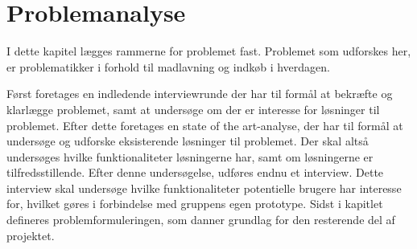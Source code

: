 \chapter{Problemanalyse}\label{chapter:problemanalyse}
I dette kapitel lægges rammerne for problemet fast.
Problemet som udforskes her, er problematikker i forhold til madlavning og indkøb i hverdagen. 

Først foretages en indledende interviewrunde der har til formål at bekræfte og klarlægge problemet, samt at undersøge om der er interesse for løsninger til problemet.
Efter dette foretages en state of the art-analyse, der har til formål at undersøge og udforske eksisterende løsninger til problemet.
Der skal altså undersøges hvilke funktionaliteter løsningerne har, samt om løsningerne er tilfredsstillende.
Efter denne undersøgelse, udføres endnu et interview.
Dette interview skal undersøge hvilke funktionaliteter potentielle brugere har interesse for, hvilket gøres i forbindelse med gruppens egen prototype.
Sidst i kapitlet defineres problemformuleringen, som danner grundlag for den resterende del af projektet.






